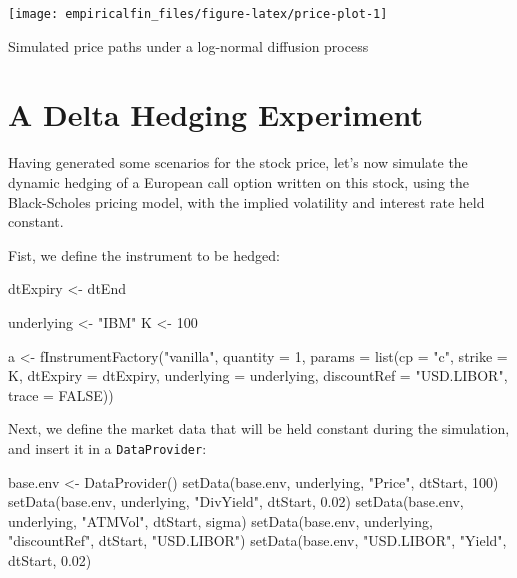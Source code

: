 \documentclass[justified]{tufte-book}
\newenvironment{Shaded}{}{}
\newcommand{\AttributeTok}[1]{\textcolor[rgb]{0.49,0.56,0.16}{#1}}
\newcommand{\ConstantTok}[1]{\textcolor[rgb]{0.53,0.00,0.00}{#1}}
\newcommand{\DecValTok}[1]{\textcolor[rgb]{0.25,0.63,0.44}{#1}}
\newcommand{\FloatTok}[1]{\textcolor[rgb]{0.25,0.63,0.44}{#1}}
\newcommand{\FunctionTok}[1]{\textcolor[rgb]{0.02,0.16,0.49}{#1}}
\newcommand{\NormalTok}[1]{#1}
\newcommand{\OtherTok}[1]{\textcolor[rgb]{0.00,0.44,0.13}{#1}}
\newcommand{\StringTok}[1]{\textcolor[rgb]{0.25,0.44,0.63}{#1}}
\newcommand{\class}[1]{\texttt{#1}}
\begin{document}
\begin{marginfigure}
\texttt{[image: empiricalfin\_files/figure-latex/price-plot-1]} \caption[Simulated price paths under a log-normal diffusion process]{Simulated price paths under a log-normal diffusion process}\label{fig:price-plot}
\end{marginfigure}

\hypertarget{a-delta-hedging-experiment}{%
\section{A Delta Hedging Experiment}\label{a-delta-hedging-experiment}}

Having generated some scenarios for the stock price, let's now simulate
the dynamic hedging of a European call option written on this stock,
using the Black-Scholes pricing model, with the implied volatility and
interest rate held constant.

Fist, we define the instrument to be hedged:

\begin{Shaded}
\begin{Highlighting}[]
\NormalTok{dtExpiry }\OtherTok{\textless{}{-}}\NormalTok{ dtEnd}

\NormalTok{underlying }\OtherTok{\textless{}{-}} \StringTok{"IBM"}
\NormalTok{K }\OtherTok{\textless{}{-}} \DecValTok{100}

\NormalTok{a }\OtherTok{\textless{}{-}} \FunctionTok{fInstrumentFactory}\NormalTok{(}\StringTok{"vanilla"}\NormalTok{, }\AttributeTok{quantity =} \DecValTok{1}\NormalTok{, }\AttributeTok{params =} \FunctionTok{list}\NormalTok{(}\AttributeTok{cp =} \StringTok{"c"}\NormalTok{,}
    \AttributeTok{strike =}\NormalTok{ K, }\AttributeTok{dtExpiry =}\NormalTok{ dtExpiry, }\AttributeTok{underlying =}\NormalTok{ underlying,}
    \AttributeTok{discountRef =} \StringTok{"USD.LIBOR"}\NormalTok{, }\AttributeTok{trace =} \ConstantTok{FALSE}\NormalTok{))}
\end{Highlighting}
\end{Shaded}

Next, we define the market data that will be held constant during the
simulation, and insert it in a \class{DataProvider}:

\begin{Shaded}
\begin{Highlighting}[]
\NormalTok{base.env }\OtherTok{\textless{}{-}} \FunctionTok{DataProvider}\NormalTok{()}
\FunctionTok{setData}\NormalTok{(base.env, underlying, }\StringTok{"Price"}\NormalTok{, dtStart, }\DecValTok{100}\NormalTok{)}
\FunctionTok{setData}\NormalTok{(base.env, underlying, }\StringTok{"DivYield"}\NormalTok{, dtStart,}
    \FloatTok{0.02}\NormalTok{)}
\FunctionTok{setData}\NormalTok{(base.env, underlying, }\StringTok{"ATMVol"}\NormalTok{, dtStart, sigma)}
\FunctionTok{setData}\NormalTok{(base.env, underlying, }\StringTok{"discountRef"}\NormalTok{, dtStart,}
    \StringTok{"USD.LIBOR"}\NormalTok{)}
\FunctionTok{setData}\NormalTok{(base.env, }\StringTok{"USD.LIBOR"}\NormalTok{, }\StringTok{"Yield"}\NormalTok{, dtStart, }\FloatTok{0.02}\NormalTok{)}
\end{Highlighting}
\end{Shaded}
\end{document}
